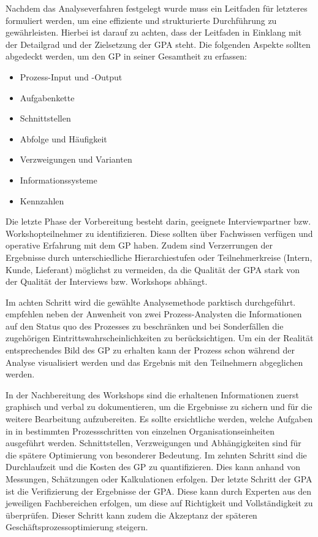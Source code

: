 Nachdem das Analyseverfahren festgelegt wurde muss ein Leitfaden für letzteres formuliert werden, um eine effiziente und strukturierte Durchführung zu gewährleisten. Hierbei ist darauf zu achten, dass der Leitfaden in Einklang mit der Detailgrad und der Zielsetzung der GPA steht. Die folgenden Aspekte sollten abgedeckt werden, um den GP in seiner Gesamtheit zu erfassen: 

\begin{multicols}{2}
\begin{itemize}
    \singlespacing
    \item Prozess-Input und -Output
    \item Aufgabenkette
    \item Schnittstellen
    \item Abfolge und Häufigkeit
    \item Verzweigungen und Varianten
    \item Informationssysteme
    \item Kennzahlen
\end{itemize}
\end{multicols}

Die letzte Phase der Vorbereitung besteht darin, geeignete Interviewpartner bzw. Workshopteilnehmer zu identifizieren. Diese sollten über Fachwissen verfügen und operative Erfahrung mit dem GP haben. Zudem sind Verzerrungen der Ergebnisse durch unterschiedliche Hierarchiestufen oder Teilnehmerkreise (Intern, Kunde, Lieferant) möglichst zu vermeiden, da die Qualität der GPA stark von der Qualität der Interviews bzw. Workshops abhängt.

Im achten Schritt wird die gewählte Analysemethode parktisch durchgeführt. \cite{theorie_best_geschaftsprozesse_optimieren_2009} empfehlen neben der Anwenheit von zwei Prozess-Analysten die Informationen auf den Status quo des Prozesses zu beschränken und bei Sonderfällen die zugehörigen Eintrittswahrscheinlichkeiten zu berücksichtigen. Um ein der Realität entsprechendes Bild des GP zu erhalten kann der Prozess schon während der Analyse visualisiert werden und das Ergebnis mit den Teilnehmern abgeglichen werden.

In der Nachbereitung des Workshops sind die erhaltenen Informationen zuerst graphisch und verbal zu dokumentieren, um die Ergebnisse zu sichern und für die weitere Bearbeitung aufzubereiten. Es sollte ersichtliche werden, welche Aufgaben in in bestimmten Prozessschritten von einzelnen Organisationseinheiten ausgeführt werden. Schnittstellen, Verzweigungen und Abhängigkeiten sind für die spätere Optimierung von besonderer Bedeutung.
Im zehnten Schritt sind die Durchlaufzeit und die Kosten des GP zu quantifizieren. Dies kann anhand von Messungen, Schätzungen oder Kalkulationen erfolgen. 
Der letzte Schritt der GPA ist die Verifizierung der Ergebnisse der GPA. Diese kann durch Experten aus den jeweiligen Fachbereichen erfolgen, um diese auf Richtigkeit und Vollständigkeit zu überprüfen. Dieser Schritt kann zudem die Akzeptanz der späteren Geschäftsprozessoptimierung steigern.

